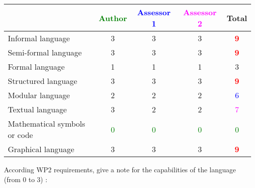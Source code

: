 \begin{tabular}{|l | c | c | c | c|}
\hline
& \textcolor{green}{Author} & \textcolor{blue}{Assessor 1} & \textcolor{magenta}{Assessor 2} & Total \\
\hline
Informal language & 3     & 3     & 3     & \textcolor{red}{\textbf{9}} \\
\hline
Semi-formal language & 3     & 3     & 3     & \textcolor{red}{\textbf{9}} \\
\hline
Formal language & 1     & 1     & 1     & 3     \\
\hline
Structured language & 3     & 3     & 3     & \textcolor{red}{\textbf{9}} \\
\hline
Modular language & 2     & 2     & 2     & \textcolor{blue}{6} \\
\hline
Textual language & 3     & 2     & 2     & \textcolor{magenta}{7} \\
\hline
Mathematical symbols or code & \textcolor{green}{0} & \textcolor{green}{0} & \textcolor{green}{0}  & \textcolor{green}{0} \\
\hline
Graphical language & 3     & 3     & 3     & \textcolor{red}{\textbf{9}} \\
\hline
\end{tabular}

According WP2 requirements, give a note for the capabilities of the language (from 0 to 3) :


